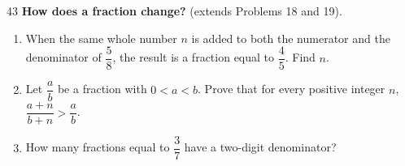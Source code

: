 \begin{probbox}{43}{}
\textbf{How does a fraction change?} (extends Problems 18 and 19).
\begin{enumerate}[label=\alph*),leftmargin=1.6em,itemsep=1pt]
\item When the same whole number $n$ is added to both the numerator and the denominator of $\dfrac58$, the result is a fraction equal to $\dfrac45$. Find $n$.
\item Let $\dfrac ab$ be a fraction with $0<a<b$. Prove that for every positive integer $n$, $\dfrac{a+n}{b+n}>\dfrac ab$.
\item How many fractions equal to $\dfrac37$ have a two-digit denominator?
\end{enumerate}
\end{probbox}
